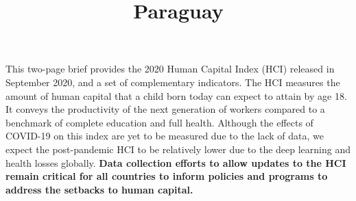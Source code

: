 \documentclass[
  9pt,
]{article}
\title{Paraguay}
\author{}
\date{\vspace{-2.5em}}
\begin{document}
\maketitle

\newcommand\boldblue[1]{\textcolor{bondiblue}{\textbf{#1}}}

This two-page brief provides the 2020 Human Capital Index (HCI) released
in September 2020, and a set of complementary indicators. The HCI
measures the amount of human capital that a child born today can expect
to attain by age 18. It conveys the productivity of the next generation
of workers compared to a benchmark of complete education and full
health. Although the effects of COVID-19 on this index are yet to be
measured due to the lack of data, we expect the post-pandemic HCI to be
relatively lower due to the deep learning and health losses globally.
\textbf{Data collection efforts to allow updates to the HCI remain
critical for all countries to inform policies and programs to address
the setbacks to human capital.}
\end{document}
